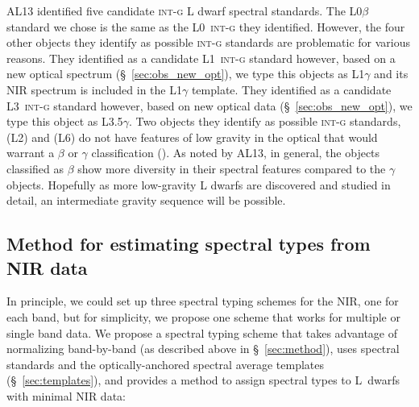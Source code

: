\documentclass[12pt,preprint]{aastex}
\begin{document}
AL13 identified five candidate \textsc{int-g} L dwarf spectral standards. 
The L0$\beta$ standard we chose is the same as the L0~\textsc{int-g} they identified. 
However, the four other objects they identify as possible \textsc{int-g} standards are problematic for various reasons.
They identified  as a candidate L1~\textsc{int-g} standard however, based on a new optical spectrum (\S~\ref{sec:obs_new_opt}), we type this objects as L1$\gamma$ and its NIR spectrum is included in the L1$\gamma$ template. 
They identified  as a candidate L3~\textsc{int-g} standard however, based on new optical data (\S~\ref{sec:obs_new_opt}), we type this object as L3.5$\gamma$. 
Two objects they identify as possible \textsc{int-g} standards,  (L2) and  (L6) do not have features of low gravity in the optical that would warrant a $\beta$ or $\gamma$ classification (\cite{Cruz07,K00}).
As noted by AL13, in general, the objects classified as $\beta$ show more diversity in their spectral features compared to the $\gamma$ objects. Hopefully as more low-gravity L dwarfs are discovered and studied in detail, an intermediate gravity sequence will be possible.

\subsection{Method for estimating spectral types from NIR data}

In principle, we could set up three spectral typing schemes for the NIR, one for each band, but for simplicity, we propose one scheme that works for multiple or single band data.
We propose a spectral typing scheme that takes advantage of normalizing band-by-band (as described above in \S~\ref{sec:method}), uses spectral standards and the optically-anchored spectral average templates (\S~\ref{sec:templates}), and provides a method to assign spectral types to L~dwarfs with minimal NIR data:
\end{document}
